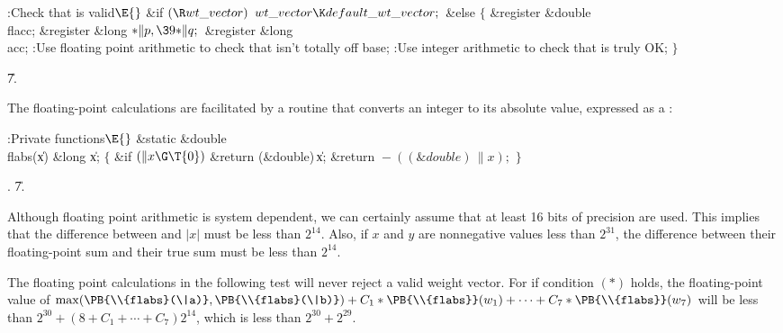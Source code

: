 \Y\B\4:Check that  is valid\X${}\E{}$\6
\&{if} ${}(\R\\{wt\_vector}){}$\1\5
${}\\{wt\_vector}\K\\{default\_wt\_vector};{}$\2\6
\&{else}\5
${}\{{}$\5
\1\&{register} \&{double} \\{flacc};\6
\&{register} \&{long} ${}{*}\|p,\39{*}\|q;{}$\6
\&{register} \&{long} \\{acc};\7
:Use floating point arithmetic to check that  isn't
totally off base\X;\6
:Use integer arithmetic to check that  is truly OK\X;\6
\4${}\}{}$\2\par
\U7.\fi

The floating-point calculations are facilitated by a routine that
converts an integer to its absolute value, expressed as a :

\Y\B\4:Private functions\X${}\E{}$\6
\1\1\&{static} \&{double} \\{flabs}(\|x)\6
\&{long} \|x;\2\2\6
${}\{{}$\5
\1\&{if} ${}(\|x\G\T{0}){}$\1\5
\&{return} (\&{double})\,\|x;\2\6
\&{return} ${}{-}((\&{double})\,\|x);{}$\6
\4${}\}{}$\2\par
{}.
\U7.\fi

Although floating point arithmetic is system dependent, we can certainly
assume that at least 16 bits of precision are used. This implies that
the difference between  and $\vert x\vert$ must be less
than $2^{14}$. Also, if $x$ and $y$ are nonnegative values less than $2^{31}$,
the difference between their floating-point sum and their true sum must be
less than $2^{14}$.

The floating point calculations in the following test will never reject a
valid weight vector. For if condition $(*)$ holds, the floating-point value of
$\max(\hbox{\PB{\\{flabs}(\|a)}},\hbox{\PB{\\{flabs}(\|b)}})+C_1*\PB{%
\\{flabs}}(w_1)+\cdots
+C_7*\PB{\\{flabs}}(w_7)$ will be less than $2^{30}+(8+C_1+\cdots+C_7)2^{14}$,
which is less than $2^{30}+2^{29}$.

